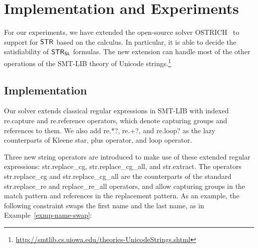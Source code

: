 
\section{Implementation and Experiments}
\label{sect:impl}


For our experiments, we have extended the open-source solver
OSTRICH~\cite{CHL+19} to support for $\mathsf{STR}$ %
based on the calculus. In particular, it is able to decide the satisfiability of
$\mathsf{STR}_{\mathsf{SL}}$ formulas. 
The new extension can handle most of the
other operations of the SMT-LIB theory of Unicode
strings.\footnote{\url{http://smtlib.cs.uiowa.edu/theories-UnicodeStrings.shtml}}



\subsection{Implementation}

Our solver extends classical regular expressions in SMT-LIB
with indexed {\sf re.capture} and {\sf re.reference} operators, which
denote capturing groups and references to them. We also add {\sf
  re.*?}, {\sf re.+?}, and {\sf re.loop?} as the lazy counterparts of
Kleene star, plus operator, and loop operator.

Three new string operators are introduced to make use of these extended regular
expressions: {\sf str.replace\_cg}, {\sf str.replace\_cg\_all}, and
{\sf str.extract}. The operators {\sf str.replace\_cg} and {\sf
  str.replace\_cg\_all} are the counterparts of the standard {\sf
  str.replace\_re} and {\sf replace\_re\_all} operators, and allow
capturing groups in the match pattern and references in the
replacement pattern. As an example, the following constraint swaps the
first name and the last name, as in Example~\ref{exmp-name-swap}:

